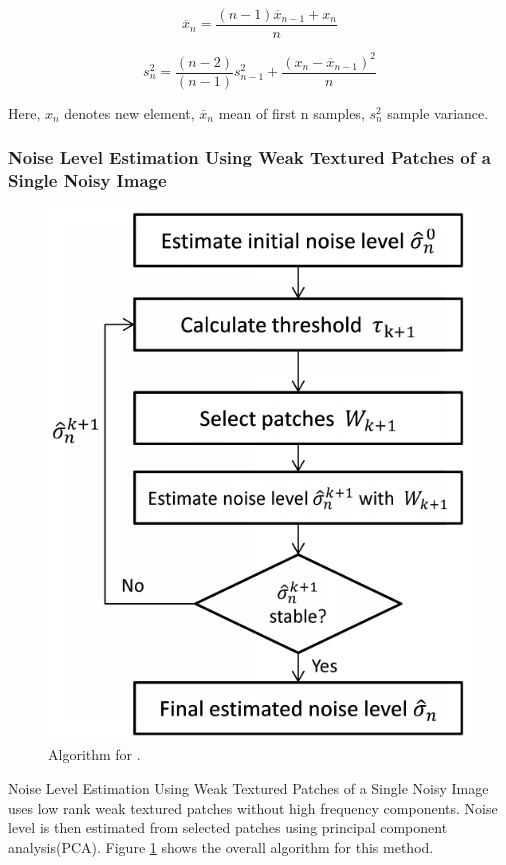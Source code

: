 \documentclass[10pt,twocolumn,letterpaper]{article}
\begin{document}
\begin{displaymath}
\overline{x}_n = \frac{(n - 1)\overline{x}_{n-1} + x_n}{n}
\end{displaymath}\label{eq:disc-var}

\begin{displaymath}
s^2_n = \frac{(n - 2)}{(n - 1)}s^2_{n-1} + \frac{(x_n - \overline{x}_{n-1})^2}{n}
\end{displaymath}\label{eq:disc-var}

Here, \(x_n\) denotes new element, \(\overline{x}_n\) mean of first n samples, \(s^2_n\) sample variance.

\subsubsection{Noise Level Estimation Using Weak Textured Patches of a Single Noisy Image} \label{ss:weak-tex}
\begin{figure}
	\includegraphics[width=0.9\columnwidth]{single_image_noise_estimation.png}
	\caption{Algorithm for \cite{noise-weak-texture}.}
	\label{fig:alg-weak-texture}
\end{figure}
Noise Level Estimation Using Weak Textured Patches of a Single Noisy Image\cite{noise-weak-texture} uses low rank weak textured patches without high frequency components. Noise level is then estimated from selected patches using principal component analysis(PCA). Figure \ref{fig:alg-weak-texture} shows the overall algorithm for this method.
\end{document}
